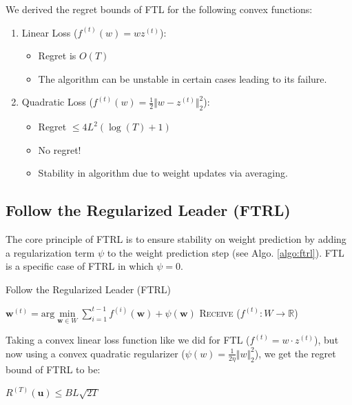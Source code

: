 \documentclass[11pt]{article}
\begin{document}
We derived the regret bounds of FTL for the following convex functions:
\begin{enumerate}
    \item Linear Loss ($f^{(t)}(w) = wz^{(t)}$):
    \begin{itemize}
        \item Regret is $O(T)$
        \item The algorithm can be unstable in certain cases leading to its failure.
    \end{itemize}
    \item Quadratic Loss ($f^{(t)}(w) = \frac{1}{2} \Vert w - z^{(t)} \Vert_{2}^{2}$): 
    \begin{itemize}
        \item Regret $\leq 4L^{2}\left( \log(T) + 1 \right)$
        \item No regret!
        \item Stability in algorithm due to weight updates via averaging.
    \end{itemize}
\end{enumerate}

\subsection{Follow the Regularized Leader (FTRL)}

The core principle of FTRL is to ensure stability on weight prediction by adding a regularization term $\psi$ to the weight prediction step (see Algo. \ref{algo:ftrl}). FTL is a specific case of FTRL in which $\psi = 0$. 

\begin{algorithm}[H]
\caption{Follow the Regularized Leader (FTRL)}
\label{algo:ftrl}
\begin{algorithmic}[1]

\STATE $\textbf{w}^{(t)} = \text{arg} \min\limits_{\textbf{w}\in W} \sum_{i=1}^{t-1} f^{(i)}(\textbf{w}) + \psi(\textbf{w})$
\STATE \textsc{Receive} ($f^{(t)}: W \rightarrow \mathbb{R}$)
\ENDFOR
\end{algorithmic}
\end{algorithm}

Taking a convex linear loss function like we did for FTL ($f^{(t)} = w \cdot z^{(t)}$), but now using a convex quadratic regularizer ($\psi(w) = \frac{1}{2\eta} \Vert w \Vert_{2}^{2}$), we get the regret bound of FTRL to be:


\centerline{$R^{(T)}(\textbf{u}) \leq BL\sqrt{2T}$}
\end{document}

